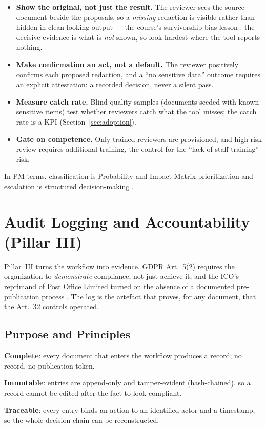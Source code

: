 \documentclass[12pt,a4paper]{article}
\begin{document}
\begin{itemize}
  \item \textbf{Show the original, not just the result.} The reviewer sees the source document beside the proposals, so a \emph{missing} redaction is visible rather than hidden in clean-looking output --- the course's survivorship-bias lesson \cite{falchi_slides}: the decisive evidence is what is \emph{not} shown, so look hardest where the tool reports nothing.
  \item \textbf{Make confirmation an act, not a default.} The reviewer positively confirms each proposed redaction, and a ``no sensitive data'' outcome requires an explicit attestation: a recorded decision, never a silent pass.
  \item \textbf{Measure catch rate.} Blind quality samples (documents seeded with known sensitive items) test whether reviewers catch what the tool misses; the catch rate is a KPI (Section~\ref{sec:adoption}).
  \item \textbf{Gate on competence.} Only trained reviewers are provisioned, and high-risk review requires additional training, the control for the ``lack of staff training'' risk.
\end{itemize}

In PM terms, classification is Probability-and-Impact-Matrix prioritization and escalation is structured decision-making \cite{falchi_slides}.

\section{Audit Logging and Accountability (Pillar III)}
\label{sec:audit}

Pillar~III turns the workflow into evidence. GDPR Art.~5(2) requires the organization to \emph{demonstrate} compliance, not just achieve it, and the ICO's reprimand of Post Office Limited turned on the absence of a documented pre-publication process \cite{ico2025}. The log is the artefact that proves, for any document, that the Art.~32 controls operated.

\subsection{Purpose and Principles}

\begin{principlebox}
\textbf{Complete}: every document that enters the workflow produces a record; no record, no publication token.\par
\textbf{Immutable}: entries are append-only and tamper-evident (hash-chained), so a record cannot be edited after the fact to look compliant.\par
\textbf{Traceable}: every entry binds an action to an identified actor and a timestamp, so the whole decision chain can be reconstructed.
\end{principlebox}
\end{document}
